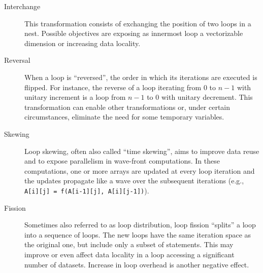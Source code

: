 \begin{description}
\item[Interchange] This transformation consists of exchanging the position of two loops in a nest. Possible objectives are exposing as innermost loop a vectorizable dimension or increasing data locality. 
\item[Reversal] When a loop is ``reversed'', the order in which its iterations are executed is flipped. For instance, the reverse of a loop iterating from $0$ to $n-1$ with unitary increment is a loop from $n-1$ to $0$ with unitary decrement. This transformation can enable other transformations or, under certain circumstances, eliminate the need for some temporary variables.
\item[Skewing] Loop skewing, often also called ``time skewing'', aims to improve data reuse and to expose parallelism in wave-front computations. In these computations, one or more arrays are updated at every loop iteration and the updates propagate like a wave over the subsequent iterations (e.g., \texttt{A[i][j] = f(A[i-1][j], A[i][j-1])}). 
\item[Fission] Sometimes also referred to as loop distribution, loop fission ``splits'' a loop into a sequence of loops. The new loops have the same iteration space as the original one, but include only a subset of statements. This may improve or even affect data locality in a loop accessing a significant number of datasets. Increase in loop overhead is another negative effect.
\end{description}

